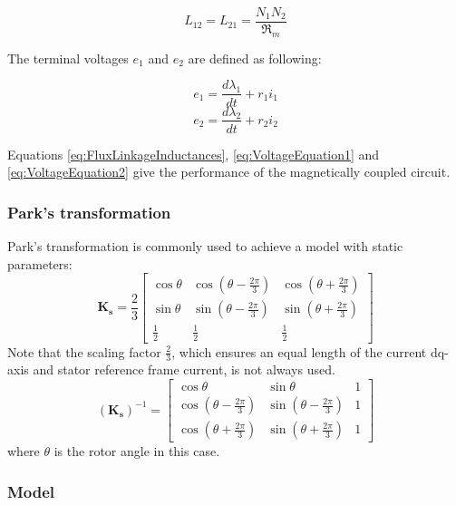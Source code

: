 \begin{equation}
	L_{12}=L_{21}= \frac{N_1 N_2}{\Re_m}
\end{equation}

The terminal voltages $e_1$ and $e_2$ are defined as following:

\begin{equation} \label{eq:VoltageEquation1}
	e_1 = \frac{d \lambda_1}{d t} + r_1 i_1
\end{equation}
\begin{equation} \label{eq:VoltageEquation2}
	e_2 = \frac{d \lambda_2}{d t} + r_2 i_2
\end{equation}

Equations \ref{eq:FluxLinkageInductances}, \ref{eq:VoltageEquation1} and \ref{eq:VoltageEquation2} give the performance of the magnetically coupled circuit.

\subsubsection{Park's transformation}

Park's transformation is commonly used to achieve a model with static parameters:
%
\begin{equation}
\mathbf{K_s} = \frac{2}{3}
 \begin{bmatrix} 
  \cos \theta & \cos(\theta-\frac{2\pi}{3}) & \cos(\theta+\frac{2\pi}{3}) \\
  \sin \theta & \sin(\theta-\frac{2\pi}{3}) & \sin(\theta+\frac{2\pi}{3}) \\
  \frac{1}{2} & \frac{1}{2} & \frac{1}{2}
 \end{bmatrix}
\end{equation}
%
Note that the scaling factor $\frac{2}{3}$, which ensures an equal length of the current dq-axis and stator reference frame current, is not always used. 
%
\begin{equation}
(\mathbf{K_s})^{-1} = 
 \begin{bmatrix} 
  \cos \theta & \sin \theta & 1 \\
  \cos(\theta-\frac{2\pi}{3}) & \sin(\theta-\frac{2\pi}{3}) & 1 \\
  \cos(\theta+\frac{2\pi}{3}) & \sin(\theta+\frac{2\pi}{3}) & 1
 \end{bmatrix}
\end{equation}
%
where $\theta$ is the rotor angle in this case.

\subsubsection{Model}

